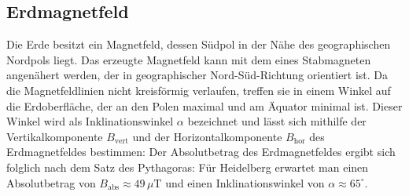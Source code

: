 \subsection{Erdmagnetfeld}
Die Erde besitzt ein Magnetfeld, dessen Südpol in der Nähe des geographischen Nordpols liegt. Das erzeugte Magnetfeld kann mit dem eines Stabmagneten angenähert werden, der in geographischer Nord-Süd-Richtung orientiert ist. Da die Magnetfeldlinien nicht kreisförmig verlaufen, treffen sie in einem Winkel auf die Erdoberfläche, der an den Polen maximal und am Äquator minimal ist. Dieser Winkel wird als Inklinationswinkel \( \alpha \) bezeichnet und lässt sich mithilfe der Vertikalkomponente \( B_{\text{vert}} \) und der Horizontalkomponente \( B_{\text{hor}} \) des Erdmagnetfeldes bestimmen:
Der Absolutbetrag des Erdmagnetfeldes ergibt sich folglich nach dem Satz des Pythagoras:
Für Heidelberg erwartet man einen Absolutbetrag von \( B_{\text{abs}} \approx 49\,\mu\text{T} \) und einen Inklinationswinkel von \( \alpha \approx 65^\circ \).